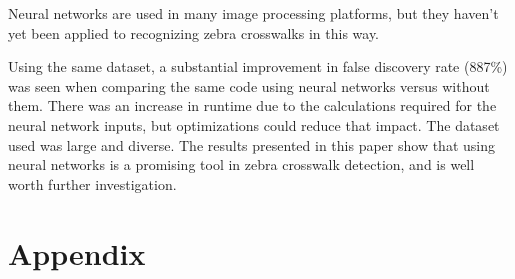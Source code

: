 \documentclass[12pt]{ucthesis}
\begin{document}
Neural networks are used in many image processing platforms, but they haven't yet been applied to recognizing zebra crosswalks in this way.


Using the same dataset, a substantial improvement in false discovery rate (887\%) was seen when comparing the same code using neural networks versus without them. There was an increase in runtime due to the calculations required for the neural network inputs, but optimizations could reduce that impact. The dataset used was large and diverse. The results presented in this paper show that using neural networks is a promising tool in zebra crosswalk detection, and is well worth further investigation.








\clearpage



\chapter{Appendix}
\end{document}
